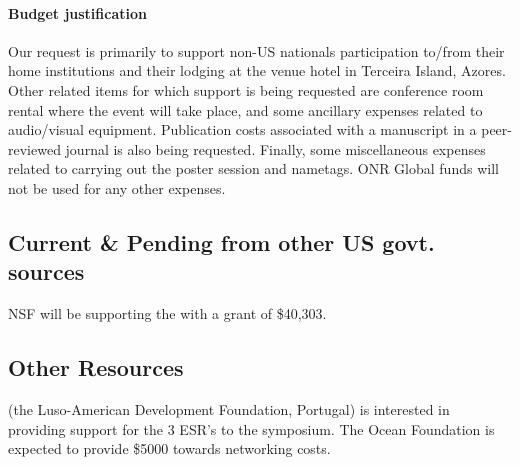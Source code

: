 \paragraph{Budget justification} Our request is primarily to support
non-US nationals participation to/from their home institutions and
their lodging at the venue hotel in Terceira Island, Azores. Other
related items for which support is being requested are conference room
rental where the event will take place, and some ancillary expenses
related to audio/visual equipment. Publication costs associated with a
manuscript in a peer-reviewed journal is also being
requested. Finally, some miscellaneous expenses related to carrying
out the poster session and nametags. ONR Global funds will not be used
for any other expenses.

\subsection{Current \& Pending from other US govt. sources}

NSF will be supporting the \symp with a grant of \$40,303.

\subsection{Other Resources}

\fla (the Luso-American Development Foundation, Portugal) is
interested in providing support for the 3 ESR's to the symposium. The
Ocean Foundation is expected to provide \$5000 towards networking
costs.
